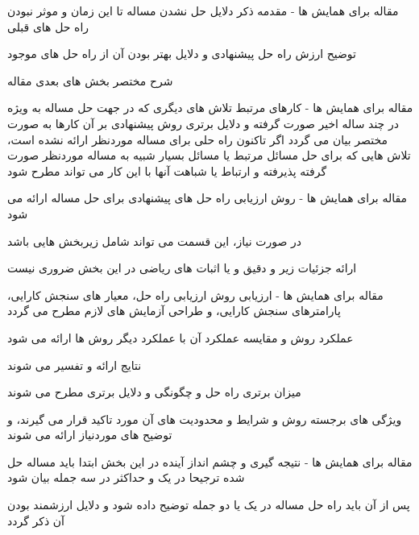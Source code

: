 \documentclass[14pt]{beamer}
\newcommand{\framefontsizelarge}{\fontsize{18pt}{0pt}\selectfont}
\newcommand{\frametitlefontsize}{\fontsize{20pt}{0pt}\selectfont}
\newcommand{\defaultvspace}{\vspace{5mm}}
\begin{document}
\begin{persian}
\begin{frame}[plain]{\frametitlefontsize مقاله برای همایش ها - مقدمه}
		ذکر دلایل حل نشدن مساله تا این زمان و موثر نبودن راه حل های قبلی
		
		توضیح ارزش راه حل پیشنهادی و دلایل بهتر بودن آن از راه حل های موجود
		
		شرح مختصر بخش های بعدی مقاله
	\end{frame}	

	\begin{frame}[plain]{\frametitlefontsize مقاله برای همایش ها - کارهای مرتبط}
		\framefontsizelarge
		تلاش های دیگری که در جهت حل مساله به ویژه در چند ساله اخیر صورت گرفته و دلایل برتری روش پیشنهادی بر آن کارها به صورت مختصر بیان می گردد
		\defaultvspace
		اگر تاکنون راه حلی برای مساله موردنظر ارائه نشده است، تلاش هایی که برای حل مسائل مرتبط یا مسائل بسیار شبیه به مساله موردنظر صورت گرفته پذیرفته و ارتباط یا شباهت آنها با این کار می تواند مطرح شود
	\end{frame}	
	
	\begin{frame}[plain]{\frametitlefontsize مقاله برای همایش ها - روش ارزیابی}
		\framefontsizelarge
		راه حل های پیشنهادی برای حل مساله ارائه می شود 
		
		در صورت نیاز، این قسمت می تواند شامل زیربخش هایی باشد
		
		ارائه جزئیات زیر و دقیق و یا اثبات های ریاضی در این بخش ضروری نیست
	\end{frame}	

	\begin{frame}[plain]{\frametitlefontsize مقاله برای همایش ها - ارزیابی}
		\framefontsizelarge
		روش ارزیابی راه حل، معیار های سنجش کارایی، پارامترهای سنجش کارایی، و طراحی آزمایش های لازم مطرح می گردد
		
		عملکرد روش و مقایسه عملکرد آن با عملکرد دیگر روش ها ارائه می شود
		
		نتایج ارائه و تفسیر می شوند
		
		میزان برتری راه حل و چگونگی و دلایل برتری مطرح می شوند
		
		ویژگی های برجسته روش و شرایط و محدودیت های آن مورد تاکید قرار می گیرند، و توضیح های موردنیاز ارائه می شوند
	\end{frame}	
	
	\begin{frame}[plain]{\frametitlefontsize مقاله برای همایش ها - نتیجه گیری و چشم انداز آینده}
		\framefontsizelarge
		در این بخش ابتدا باید مساله حل شده ترجیحا در یک و حداکثر در سه جمله بیان شود
		
		پس از آن باید راه حل مساله در یک یا دو جمله توضیح داده شود و دلایل ارزشمند بودن آن ذکر گردد
		

\end{frame}
\end{persian}
\end{document}
